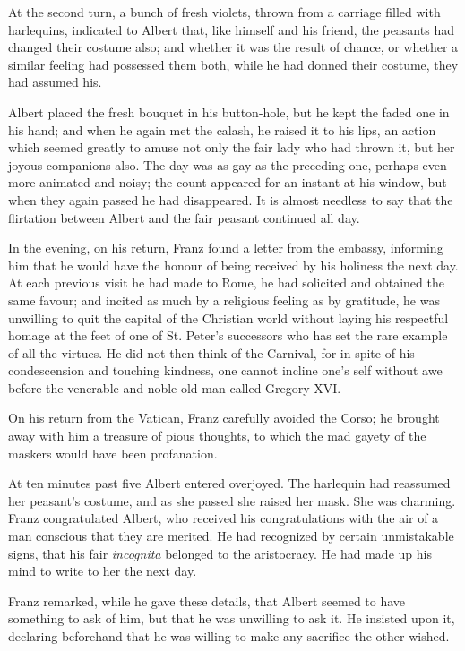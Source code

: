  At the second turn, a bunch of fresh violets, thrown from a carriage filled with harlequins, indicated to Albert that, like himself and his friend, the peasants had changed their costume also; and whether it was the result of chance, or whether a similar feeling had possessed them both, while he had donned their costume, they had assumed his. 

 Albert placed the fresh bouquet in his button-hole, but he kept the faded one in his hand; and when he again met the calash, he raised it to his lips, an action which seemed greatly to amuse not only the fair lady who had thrown it, but her joyous companions also. The day was as gay as the preceding one, perhaps even more animated and noisy; the count appeared for an instant at his window, but when they again passed he had disappeared. It is almost needless to say that the flirtation between Albert and the fair peasant continued all day. 

 In the evening, on his return, Franz found a letter from the embassy, informing him that he would have the honour of being received by his holiness the next day. At each previous visit he had made to Rome, he had solicited and obtained the same favour; and incited as much by a religious feeling as by gratitude, he was unwilling to quit the capital of the Christian world without laying his respectful homage at the feet of one of St. Peter's successors who has set the rare example of all the virtues. He did not then think of the Carnival, for in spite of his condescension and touching kindness, one cannot incline one's self without awe before the venerable and noble old man called Gregory XVI. 

 On his return from the Vatican, Franz carefully avoided the Corso; he brought away with him a treasure of pious thoughts, to which the mad gayety of the maskers would have been profanation. 

 At ten minutes past five Albert entered overjoyed. The harlequin had reassumed her peasant's costume, and as she passed she raised her mask. She was charming. Franz congratulated Albert, who received his congratulations with the air of a man conscious that they are merited. He had recognized by certain unmistakable signs, that his fair \textit{incognita} belonged to the aristocracy. He had made up his mind to write to her the next day. 

 Franz remarked, while he gave these details, that Albert seemed to have something to ask of him, but that he was unwilling to ask it. He insisted upon it, declaring beforehand that he was willing to make any sacrifice the other wished. 

